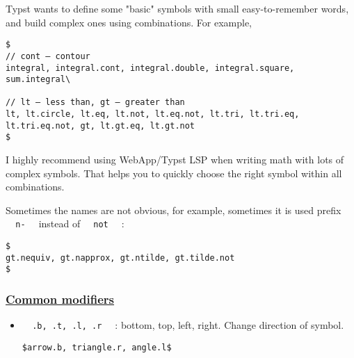 Typst wants to define some "basic" symbols with small easy-to-remember
words, and build complex ones using combinations. For example,

\begin{verbatim}
$
// cont — contour
integral, integral.cont, integral.double, integral.square, sum.integral\

// lt — less than, gt — greater than
lt, lt.circle, lt.eq, lt.not, lt.eq.not, lt.tri, lt.tri.eq, lt.tri.eq.not, gt, lt.gt.eq, lt.gt.not
$
\end{verbatim}

\pandocbounded{}

I highly recommend using WebApp/Typst LSP when writing math with lots of
complex symbols. That helps you to quickly choose the right symbol
within all combinations.

Sometimes the names are not obvious, for example, sometimes it is used
prefix \texttt{\ }{\texttt{\ n-\ }}\texttt{\ } instead of
\texttt{\ }{\texttt{\ not\ }}\texttt{\ } :

\begin{verbatim}
$
gt.nequiv, gt.napprox, gt.ntilde, gt.tilde.not
$
\end{verbatim}

\pandocbounded{}

\subsubsection{\texorpdfstring{\hyperref[common-modifiers]{Common
modifiers}}{Common modifiers}}\label{common-modifiers}

\begin{itemize}
\item
  \texttt{\ }{\texttt{\ .b,\ .t,\ .l,\ .r\ }}\texttt{\ } : bottom, top,
  left, right. Change direction of symbol.

\begin{verbatim}
$arrow.b, triangle.r, angle.l$
\end{verbatim}

  \pandocbounded{}
\end{itemize}



